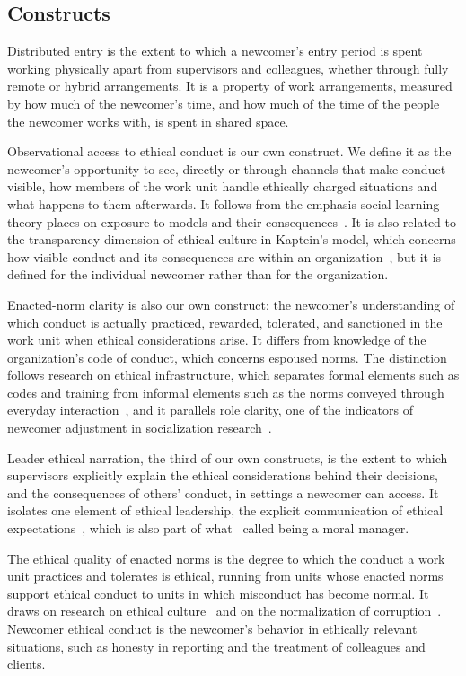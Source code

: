 \subsection{Constructs}

Distributed entry is the extent to which a newcomer's entry period is spent working physically apart from supervisors and colleagues, whether through fully remote or hybrid arrangements. It is a property of work arrangements, measured by how much of the newcomer's time, and how much of the time of the people the newcomer works with, is spent in shared space.

Observational access to ethical conduct is our own construct. We define it as the newcomer's opportunity to see, directly or through channels that make conduct visible, how members of the work unit handle ethically charged situations and what happens to them afterwards. It follows from the emphasis social learning theory places on exposure to models and their consequences~\citep{bandura1977social}. It is also related to the transparency dimension of ethical culture in Kaptein's model, which concerns how visible conduct and its consequences are within an organization~\citep{kaptein2008developing}, but it is defined for the individual newcomer rather than for the organization.

Enacted-norm clarity is also our own construct: the newcomer's understanding of which conduct is actually practiced, rewarded, tolerated, and sanctioned in the work unit when ethical considerations arise. It differs from knowledge of the organization's code of conduct, which concerns espoused norms. The distinction follows research on ethical infrastructure, which separates formal elements such as codes and training from informal elements such as the norms conveyed through everyday interaction~\citep{tenbrunsel2003building}, and it parallels role clarity, one of the indicators of newcomer adjustment in socialization research~\citep{bauer2007newcomer}.

Leader ethical narration, the third of our own constructs, is the extent to which supervisors explicitly explain the ethical considerations behind their decisions, and the consequences of others' conduct, in settings a newcomer can access. It isolates one element of ethical leadership, the explicit communication of ethical expectations~\citep{brown2005ethical}, which is also part of what~\citet{trevino2000moral} called being a moral manager.

The ethical quality of enacted norms is the degree to which the conduct a work unit practices and tolerates is ethical, running from units whose enacted norms support ethical conduct to units in which misconduct has become normal. It draws on research on ethical culture~\citep{trevino1998ethical,kaptein2008developing} and on the normalization of corruption~\citep{ashforth2003normalization}. Newcomer ethical conduct is the newcomer's behavior in ethically relevant situations, such as honesty in reporting and the treatment of colleagues and clients.

